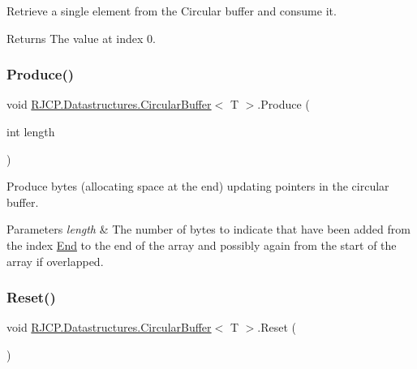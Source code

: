 Retrieve a single element from the Circular buffer and consume it. 

\begin{DoxyReturn}{Returns}
The value at index 0.
\end{DoxyReturn}
\mbox{\label{class_r_j_c_p_1_1_datastructures_1_1_circular_buffer_aaca74dd28d174ddb86e0b8548a676889}} 
\subsubsection{\texorpdfstring{Produce()}{Produce()}}
{\footnotesize\ttfamily void \mbox{\hyperlink{class_r_j_c_p_1_1_datastructures_1_1_circular_buffer}{R\+J\+C\+P.\+Datastructures.\+Circular\+Buffer}}$<$ T $>$.Produce (\begin{DoxyParamCaption}\item[{int}]{length }\end{DoxyParamCaption})}



Produce bytes (allocating space at the end) updating pointers in the circular buffer. 


\begin{DoxyParams}{Parameters}
{\em length} & The number of bytes to indicate that have been added from the index \mbox{\hyperlink{class_r_j_c_p_1_1_datastructures_1_1_circular_buffer_a8e98be8b2cf3d34965db9d7813443169}{End}} to the end of the array and possibly again from the start of the array if overlapped.\\
\hline
\end{DoxyParams}
\mbox{\label{class_r_j_c_p_1_1_datastructures_1_1_circular_buffer_af41b02f6c8de83e723a7116525c7c182}} 
\subsubsection{\texorpdfstring{Reset()}{Reset()}}
{\footnotesize\ttfamily void \mbox{\hyperlink{class_r_j_c_p_1_1_datastructures_1_1_circular_buffer}{R\+J\+C\+P.\+Datastructures.\+Circular\+Buffer}}$<$ T $>$.Reset (\begin{DoxyParamCaption}{ }\end{DoxyParamCaption})}



